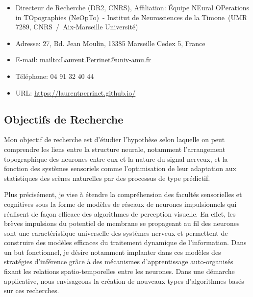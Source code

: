 \documentclass[10pt,french,a4paper,oneside]{article}%
\makeatletter
\newcommand{\Team}{\'Equipe NEural OPerations in TOpographies (NeOpTo)}%
\newcommand{\Institute}{Institut de Neurosciences de la Timone}%
\newcommand{\InstituteUMR}{UMR 7289, CNRS~/~Aix-Marseille Université}%
\newcommand{\Address}{27, Bd. Jean Moulin, 13385 Marseille Cedex 5, France}
\newcommand{\Website}{https://laurentperrinet.github.io/}
\newcommand{\Email}{Laurent.Perrinet@univ-amu.fr}
\makeatother
\begin{document}
\begin{itemize}
\item Directeur de Recherche (DR2, CNRS), Affiliation: \Team\ - \Institute\ (\InstituteUMR)
\item Adresse: \Address
\item E-mail: \url{mailto:\Email}
\item Téléphone: 04 91 32 40 44
\item URL: \url{\Website}
\end{itemize}


\subsection*{Objectifs de Recherche}

Mon objectif de recherche est d'étudier l'hypothèse selon laquelle on peut comprendre les liens entre la structure neurale, notamment l'arrangement topographique des neurones entre eux et la nature du signal nerveux, et la fonction des systèmes sensoriels comme l'optimisation de leur adaptation aux statistiques des scènes naturelles par des processus de type prédictif.

Plus précisément, je vise à étendre la compréhension des facultés sensorielles et cognitives sous la forme de modèles de réseaux de neurones impulsionnels qui réalisent de façon efficace des algorithmes de  perception visuelle. En effet, les brèves impulsions du potentiel de membrane se propageant au fil des neurones sont une caractéristique universelle des systèmes nerveux et permettent de construire des modèles efficaces du traitement dynamique de l'information. Dans un but fonctionnel, je désire notamment implanter dans ces modèles des stratégies d'inférence grâce à des mécanismes d'apprentissage auto-organisés fixant les relations spatio-temporelles entre les neurones. Dans une démarche applicative, nous envisageons la création de nouveaux types d'algorithmes basés sur ces recherches.
\end{document}
